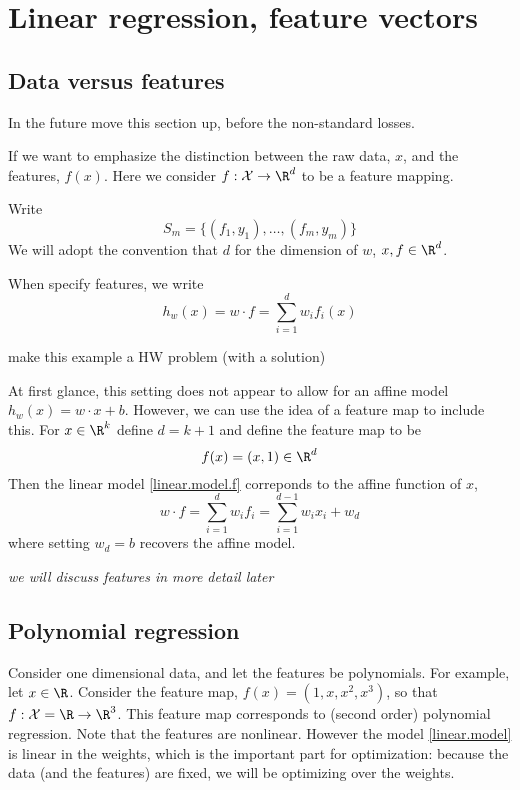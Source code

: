 \documentclass[12pt]{amsart}
\begin{document}
\section{Linear regression, feature vectors}


\subsection{Data versus features}

\begin{TODO}
In the future move this section up, before the non-standard losses.	
\end{TODO}


If we want to emphasize the distinction between the raw data, $x$, and the features, $f(x)$.
Here we consider $f:\mathcal X \to \R^d$ to be a feature mapping. 


Write  
\[
S_m = \{(f_1, y_1), \dots, (f_m, y_m) \}
\]
We will adopt the convention that  $d$ for the dimension of $w$, $x,f \in \R^d$. 

When specify features, we write
\begin{equation}
	\label{linear.model.f}
	h_{w}(x) = w\cdot f = \sum_{i=1}^d w_i f_i(x)
\end{equation}

\begin{example}
\begin{TODO}
make this example a HW problem (with a solution) 	
\end{TODO}
At first glance, this setting does not appear to allow for an affine model $h_w(x) = w\cdot x + b$.  However, we can use the idea of a feature map to include this. 
For $x\in \R^{k}$ define $d = k+1$ and define the feature map to be
\[
f(x) = (x,1) \in \R^d
\] 
Then the linear model \eqref{linear.model.f} correponds to the affine function of $x$, 
\[
w\cdot f =\sum_{i=1}^d w_i f_i = \sum_{i=1}^{d-1} w_i x_i + w_d
\]
where setting $w_d = b$ recovers the affine model. 
\end{example}

\emph{we will discuss features in more detail later}

\subsection{Polynomial regression}
Consider one dimensional data, and let the features be polynomials. 
For example, let $x\in \R$.  Consider the feature map,  $f(x) = (1,x,x^2,x^3)$, so that $f:\mathcal X = \R \to \R^3$. 
This feature map corresponds to (second order) polynomial regression.  Note that the features are nonlinear.  However the model \eqref{linear.model} is linear in the weights, which is the important part for optimization: because the data (and the features) are fixed, we will be optimizing over the weights.
\end{document}
